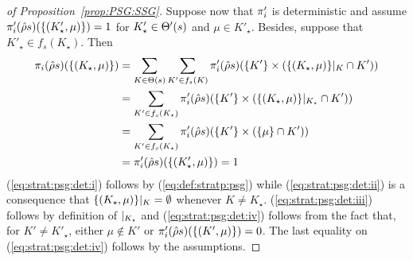 \begin{proof}[of Proposition~\ref{prop:PSG:SSG}]
  Suppose now that $\pi'_{i}$ is deterministic and assume
  $\pi'_{i}(\hat{\rho}s)(\{(K'_\star,\mu)\})=1$ for
  $K'_\star\in\Theta'(s)$ and $\mu\in K'_\star$.  Besides, suppose
  that $K'_\star\in f_{s}(K_\star)$.  Then
  \begin{align}
    \pi_{i}(\hat{\rho}s)(\{(K_\star,\mu)\})
    & =
    \sum_{K\in\Theta(s)} \sum_{K'\in f_{s}(K)} \pi'_{i}(\hat{\rho}s)(\{K'\}\times({\{(K_\star,\mu)\}{|_{K}}}\cap K'))
    \label{eq:strat:psg:det:i}\\
    & =
    \sum_{K'\in f_{s}(K_\star)} \pi'_{i}(\hat{\rho}s)(\{K'\}\times({\{(K_\star,\mu)\}{|_{K_\star}}}\cap K'))
    \label{eq:strat:psg:det:ii}\\
    & =
    \sum_{K'\in f_{s}(K_\star)} \pi'_{i}(\hat{\rho}s)(\{K'\}\times(\{\mu\}\cap K'))
    \label{eq:strat:psg:det:iii}\\
    & =
    \pi'_{i}(\hat{\rho}s)(\{(K'_\star,\mu)\}) = 1
    \label{eq:strat:psg:det:iv}
  \end{align}
  (\ref{eq:strat:psg:det:i}) follows by (\ref{eq:def:stratp:psg})
  while (\ref{eq:strat:psg:det:ii}) is a consequence that
  $\{(K_\star,\mu)\}{|_{K}}=\emptyset$ whenever $K\neq K_\star$.
  (\ref{eq:strat:psg:det:iii}) follows by definition of
  ${|_{K_\star}}$ and (\ref{eq:strat:psg:det:iv}) follows from the
  fact that, for $K'\neq K'_\star$, either $\mu\notin K'$ or
  $\pi'_{i}(\hat{\rho}s)(\{(K',\mu)\})=0$.  The last equality on
  (\ref{eq:strat:psg:det:iv}) follows by the assumptions.


\end{proof}
